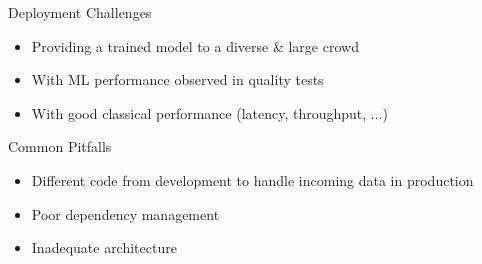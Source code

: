 \begin{frame}{Deployment Challenges}
  \begin{itemize}
    \item Providing a trained model to a diverse \& large crowd
    \item With ML performance observed in quality tests
    \item With good classical performance (latency, throughput, ...)
  \end{itemize}
\end{frame}

\begin{frame}{Common Pitfalls}
  \begin{itemize}
    \item Different code from development to handle incoming data in production
    \item Poor dependency management
    \item Inadequate architecture
  \end{itemize}
\end{frame}
